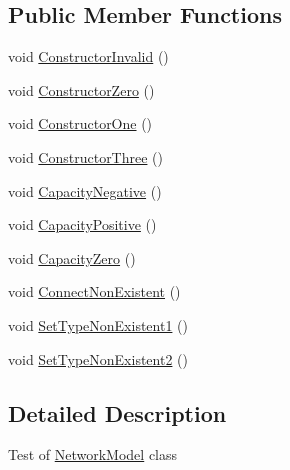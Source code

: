 \subsection*{Public Member Functions}
\begin{DoxyCompactItemize}
\item 
void \hyperlink{classNetTrafficSimulator_1_1NetworkModelTest_afbd7470eb35b97512aa94a2f53163430}{Constructor\-Invalid} ()
\item 
void \hyperlink{classNetTrafficSimulator_1_1NetworkModelTest_a3634f2a5d0e008e7cd8b274615b173ee}{Constructor\-Zero} ()
\item 
void \hyperlink{classNetTrafficSimulator_1_1NetworkModelTest_a6a13d32fefa5e53b7f18e89b2fb8b436}{Constructor\-One} ()
\item 
void \hyperlink{classNetTrafficSimulator_1_1NetworkModelTest_a149aa9eab4b53fb17aa19be215e769b5}{Constructor\-Three} ()
\item 
void \hyperlink{classNetTrafficSimulator_1_1NetworkModelTest_a65d10ee966cdf6e5f6b82f2a0bc27534}{Capacity\-Negative} ()
\item 
void \hyperlink{classNetTrafficSimulator_1_1NetworkModelTest_aabbe4c4e9d269407fd7a379f790f5f20}{Capacity\-Positive} ()
\item 
void \hyperlink{classNetTrafficSimulator_1_1NetworkModelTest_a165b1f1f037b67821ca60965fc2ee4ab}{Capacity\-Zero} ()
\item 
void \hyperlink{classNetTrafficSimulator_1_1NetworkModelTest_a4486a9e43cc7207230e54dfa6f1cc9a2}{Connect\-Non\-Existent} ()
\item 
void \hyperlink{classNetTrafficSimulator_1_1NetworkModelTest_abd1f2f4cabb9fcce56d20b807f662a8b}{Set\-Type\-Non\-Existent1} ()
\item 
void \hyperlink{classNetTrafficSimulator_1_1NetworkModelTest_ac9cd8811b6011919d81dda53abb887c1}{Set\-Type\-Non\-Existent2} ()
\end{DoxyCompactItemize}


\subsection{Detailed Description}
Test of \hyperlink{classNetTrafficSimulator_1_1NetworkModel}{Network\-Model} class 

